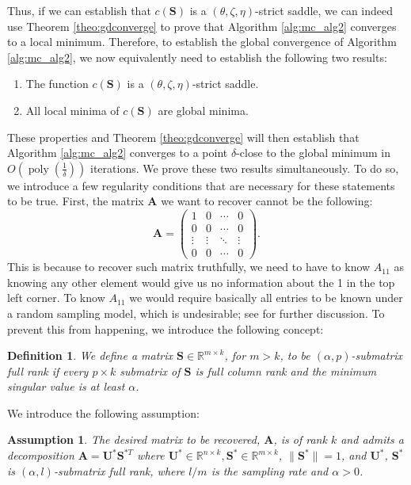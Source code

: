 \documentclass[twoside,11pt]{article}
\newcommand{\md}[1]{\mathbb{#1}}
\newtheorem{defi}{Definition}
\newtheorem{assumption}{Assumption}
\DeclareMathOperator\poly{poly}
\begin{document}
Thus, if we can establish that $c(\bm{S})$ is a $(\theta,\zeta, \eta)$-strict saddle, we can indeed use Theorem \ref{theo:gdconverge} to prove that Algorithm \ref{alg:mc_alg2} converges to a local minimum. Therefore, to establish the global convergence of Algorithm \ref{alg:mc_alg2}, we now equivalently need to establish the following two results:
\begin{enumerate}
    \item The function $c(\bm{S})$ is a $(\theta, \zeta, \eta)$-strict saddle. 
    \item All local minima of $c(\bm{S})$ are global minima.
\end{enumerate}
These properties and Theorem  \ref{theo:gdconverge} will then establish that 
Algorithm \ref{alg:mc_alg2}  converges to a point $\delta$-close to the global minimum in $O\left(\poly\left(\frac{1}{\delta}\right)\right)$ iterations. We prove these two results simultaneously. To do so, we introduce a few regularity conditions that are necessary for these statements to be true. First, the matrix $\bm{A}$ we want to recover cannot be the following:
\begin{equation}
\bm{A}=\begin{pmatrix}
1 & 0 & \cdots & 0\\
0 & 0 & \cdots & 0\\
\vdots & \vdots & \ddots & \vdots \\
0 & 0 & \cdots & 0
\end{pmatrix}. \label{eq:badmatrix}
\end{equation}
This is because to recover such matrix truthfully, we  need to have to know $A_{11}$ as knowing any other element would give us no information about the 1 in the top left corner. To know $A_{11}$ we  
would require basically all entries  to be known under a random sampling model, which is undesirable; see \cite{candes2009exact} for further discussion. To prevent this from happening, we introduce the following concept:
\begin{defi}
We define a matrix $\bm{S} \in \md{R}^{m \times k}$, for $m>k$, to be $(\alpha,p)$-submatrix full rank
if every $p \times k$ submatrix of $\bm{S}$ is full column rank and the minimum singular value is at least $\alpha $. 
\end{defi} 
We introduce the following assumption:
\begin{assumption}
\label{ass:ripweak}
The desired matrix to be recovered, $\bm{A}$, is of rank $k$ and admits a decomposition $\bm{A}=\bm{U}^*\bm{S}^{*T}$ where $\bm{U}^*\in \md{R}^{n \times k}, \bm{S}^* \in \md{R}^{m \times k}$, $\|\bm{S}^*\|=1$, and $\bm{U}^*$, $\bm{S}^*$ is $(\alpha, l)$-submatrix full rank, where $l/m$ is the sampling rate and  $\alpha>0$. 
\end{assumption}
\end{document}
